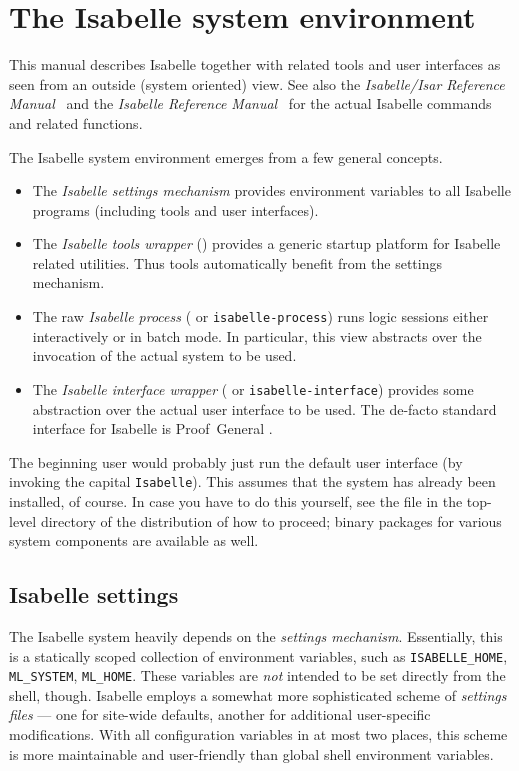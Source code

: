 

\chapter{The Isabelle system environment}

This manual describes Isabelle together with related tools and user interfaces
as seen from an outside (system oriented) view.  See also the
\emph{Isabelle/Isar Reference Manual}~\cite{isabelle-isar-ref} and the
\emph{Isabelle Reference Manual}~\cite{isabelle-ref} for the actual Isabelle
commands and related functions.

\medskip The Isabelle system environment emerges from a few general concepts.
\begin{itemize}
\item The \emph{Isabelle settings mechanism} provides environment variables to
  all Isabelle programs (including tools and user interfaces).
\item The \emph{Isabelle tools wrapper} () provides a generic
  startup platform for Isabelle related utilities.  Thus tools automatically
  benefit from the settings mechanism.
\item The raw \emph{Isabelle process} ( or
  \texttt{isabelle-process}) runs logic sessions either interactively or in
  batch mode.  In particular, this view abstracts over the invocation of the
  actual {\ML} system to be used.
\item The \emph{Isabelle interface wrapper} ( or
  \texttt{isabelle-interface}) provides some abstraction over the actual user
  interface to be used.  The de-facto standard interface for Isabelle is
  Proof~General \cite{proofgeneral}.
\end{itemize}

\medskip The beginning user would probably just run the default user interface
(by invoking the capital \texttt{Isabelle}).  This assumes that the system has
already been installed, of course.  In case you have to do this yourself, see
the  file in the top-level directory of the distribution of
how to proceed; binary packages for various system components are available as
well.


\section{Isabelle settings} \label{sec:settings}

The Isabelle system heavily depends on the \emph{settings
  mechanism}.  Essentially, this is a statically scoped
collection of environment variables, such as \texttt{ISABELLE_HOME},
\texttt{ML_SYSTEM}, \texttt{ML_HOME}.  These variables are \emph{not} intended
to be set directly from the shell, though.  Isabelle employs a somewhat more
sophisticated scheme of \emph{settings files} --- one for site-wide defaults,
another for additional user-specific modifications.  With all configuration
variables in at most two places, this scheme is more maintainable and
user-friendly than global shell environment variables.

